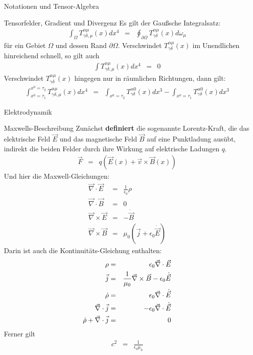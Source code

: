 \begin{chapter}{\titlestr}
\begin{section}{Notationen und Tensor-Algebra}
\begin{subsection}{Tensorfelder, Gradient und Divergenz}
Es gilt der Gaußsche Integralsatz:
\begin{eqnarray*}
\int_\Omega T^{\alpha\mu}_{\gamma\delta,\mu}(x) dx^4 &=& \oint_{\partial\Omega} T^{\alpha\mu}_{\gamma\delta}(x) d\omega_\mu
\end{eqnarray*}
für ein Gebiet $\Omega$ und dessen Rand $\partial\Omega$. Verschwindet $T^{\alpha\mu}_{\gamma\delta}(x)$ im Unendlichen hinreichend schnell, so gilt auch
\begin{eqnarray*}
\int T^{\alpha\mu}_{\gamma\delta,\mu}(x) dx^4 &=& 0
\end{eqnarray*}
Verschwindet $T^{\alpha\mu}_{\gamma\delta}(x)$ hingegen nur in räumlichen Richtungen, dann gilt:
\begin{eqnarray*}
\int_{x^0=\tau_1}^{x^0=\tau_2} T^{\alpha\mu}_{\gamma\delta,\mu}(x) dx^4 &=& \int_{x^0=\tau_2} T^{\alpha 0}_{\gamma\delta}(x) dx^3
-\int_{x^0=\tau_1} T^{\alpha 0}_{\gamma\delta}(x) dx^3
\end{eqnarray*}

\end{subsection}
\end{section}


\begin{section}{Elektrodynamik}

\begin{subsection}{Maxwells-Beschreibung}
Zunächst \textbf{definiert} die sogenannte Lorentz-Kraft, die das elektrische Feld $\vec{E}$ und das magnetische Feld $\vec{B}$ auf eine Punktladung ausübt, indirekt die beiden Felder durch ihre Wirkung auf elektrische Ladungen $q$.
\begin{eqnarray}
\label{relt_lorentz_force}
\vec{F} &=& q\left(\vec{E}(x)+\vec{v}\times\vec{B}(x)\right)
\end{eqnarray}
Und hier die Maxwell-Gleichungen:
\begin{eqnarray}
\label{relt_coulomb_eqn}
\vec{\nabla}\cdot\vec{E} &=& \frac{1}{\epsilon_0}\rho\\
\label{relt_no_magnetic_source_eqn}
\vec{\nabla}\cdot\vec{B} &=& 0\\
\label{relt_faraday_induction_eqn}
\vec{\nabla}\times\vec{E} &=& -\dot{\vec{B}}\\
\label{relt_ampere_current_makes_magnetic_field}
\vec{\nabla}\times\vec{B} &=& \mu_0\left(\vec{j}+\epsilon_0\dot{\vec{E}}\right)
\end{eqnarray}
Darin ist auch die Kontinuitäts-Gleichung enthalten:
\begin{eqnarray}
\label{relt_continuity_eqn}
\rho &=&\epsilon_0\vec{\nabla}\cdot\vec{E}\cr
\vec{j} &=& \frac{1}{\mu_0}\vec{\nabla}\times\vec{B}-\epsilon_0\dot{\vec{E}}\cr
\dot{\rho} &=&\epsilon_0\vec{\nabla}\cdot\dot{\vec{E}}\cr
\vec{\nabla}\cdot\vec{j} &=& -\epsilon_0\vec{\nabla}\cdot\dot{\vec{E}}\cr
\dot{\rho}+\vec{\nabla}\cdot\vec{j} &=& 0
\end{eqnarray}
Ferner gilt
\begin{eqnarray}
c^2 &=& \frac{1}{\epsilon_0\mu_0}
\end{eqnarray}
\end{subsection}


\end{section}
\end{chapter}
